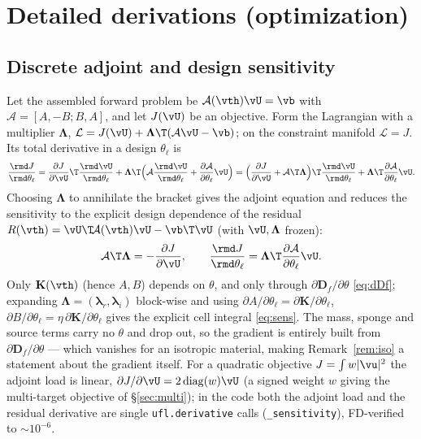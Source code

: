 \documentclass[11pt]{article}
\begin{document}
\section{Detailed derivations (optimization)}
\label{app:derivopt}

\subsection{Discrete adjoint and design sensitivity}
Let the assembled forward problem be $\mathcal A(\vth)\vU=\vb$ with
$\mathcal A=[A,-B;B,A]$, and let $J(\vU)$ be an objective. Form the Lagrangian with
a multiplier $\bm\Lambda$,
$\mathcal L=J(\vU)+\bm\Lambda\T(\mathcal A\vU-\vb)$; on the constraint manifold
$\mathcal L=J$. Its total derivative in a design $\theta_\ell$ is
\begin{equation}
  \frac{\rmd J}{\rmd\theta_\ell}
  =\frac{\partial J}{\partial\vU}\T\frac{\rmd\vU}{\rmd\theta_\ell}
  +\bm\Lambda\T\Bigl(\mathcal A\frac{\rmd\vU}{\rmd\theta_\ell}
  +\frac{\partial\mathcal A}{\partial\theta_\ell}\vU\Bigr)
  =\Bigl(\frac{\partial J}{\partial\vU}+\mathcal A\T\bm\Lambda\Bigr)\T
  \frac{\rmd\vU}{\rmd\theta_\ell}
  +\bm\Lambda\T\frac{\partial\mathcal A}{\partial\theta_\ell}\vU .
\end{equation}
Choosing $\bm\Lambda$ to annihilate the bracket gives the adjoint equation and
reduces the sensitivity to the explicit design dependence of the residual
$R(\vth)=\vU\T\!\mathcal A(\vth)\vU-\vb\T\vU$ (with $\vU,\bm\Lambda$ frozen):
\begin{equation}
  \mathcal A\T\bm\Lambda=-\frac{\partial J}{\partial\vU},\qquad
  \frac{\rmd J}{\rmd\theta_\ell}=\bm\Lambda\T
  \frac{\partial\mathcal A}{\partial\theta_\ell}\vU .
\end{equation}
Only $\mathbf K(\vth)$ (hence $A,B$) depends on $\theta$, and only through
$\partial\mathbf D_f/\partial\theta$ \eqref{eq:dDf}; expanding $\bm\Lambda=(\bm
\lambda_r,\bm\lambda_i)$ block-wise and using $\partial A/\partial\theta_\ell=
\partial\mathbf K/\partial\theta_\ell$, $\partial B/\partial\theta_\ell=\eta\,
\partial\mathbf K/\partial\theta_\ell$ gives the explicit cell integral
\eqref{eq:sens}. The mass, sponge and source terms carry no $\theta$ and drop out,
so the gradient is entirely built from $\partial\mathbf D_f/\partial\theta$ ---
which vanishes for an isotropic material, making Remark~\ref{rem:iso} a statement
about the gradient itself. For a quadratic objective $J=\int w|\vu|^2$ the adjoint
load is linear, $\partial J/\partial\vU=2\,\mathrm{diag}(w)\vU$ (a signed weight
$w$ giving the multi-target objective of \S\ref{sec:multi}); in the code both the
adjoint load and the residual derivative are single \texttt{ufl.derivative} calls
(\texttt{\_sensitivity}), FD-verified to $\sim\!10^{-6}$.
\end{document}

